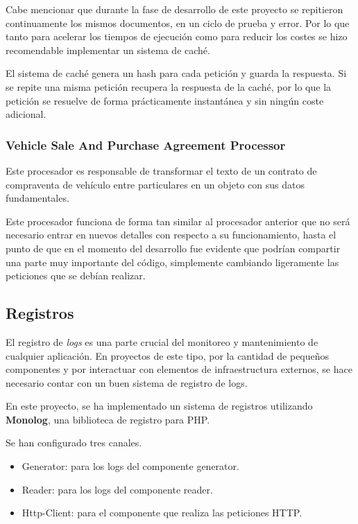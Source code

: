 Cabe mencionar que durante la fase de desarrollo de este proyecto se repitieron continuamente los mismos documentos,
en un ciclo de prueba y error.
Por lo que tanto para acelerar los tiempos de ejecución como para reducir los costes se hizo recomendable implementar un
sistema de caché.

El sistema de caché genera un hash para cada petición y guarda la respuesta.
Si se repite una misma petición recupera la respuesta de la caché, por lo que la petición se resuelve de forma
prácticamente instantánea y sin ningún coste adicional.

\subsubsection*{Vehicle Sale And Purchase Agreement Processor}

Este procesador es responsable de transformar el texto de un contrato de compraventa de vehículo entre particulares en
un objeto con sus datos fundamentales.

Este procesador funciona de forma tan similar al procesador anterior que no será necesario entrar en nuevos detalles
con respecto a su funcionamiento, hasta el punto de que en el momento del desarrollo fue evidente que podrían
compartir una parte muy importante del código, simplemente cambiando ligeramente las peticiones que se debían realizar.

\subsection*{Registros}\label{subsec:logs}

El registro de \textit{logs} es una parte crucial del monitoreo y mantenimiento de cualquier aplicación.
En proyectos de este tipo, por la cantidad de pequeños componentes y por interactuar con elementos de infraestructura
externos, se hace necesario contar con un buen sistema de registro de logs.

En este proyecto, se ha implementado un sistema de registros utilizando \textbf{Monolog}, una biblioteca de registro
para PHP.

Se han configurado tres canales.

\begin{itemize}
    \item Generator: para los logs del componente generator.
    \item Reader: para los logs del componente reader.
    \item Http-Client: para el componente que realiza las peticiones HTTP.
\end{itemize}


